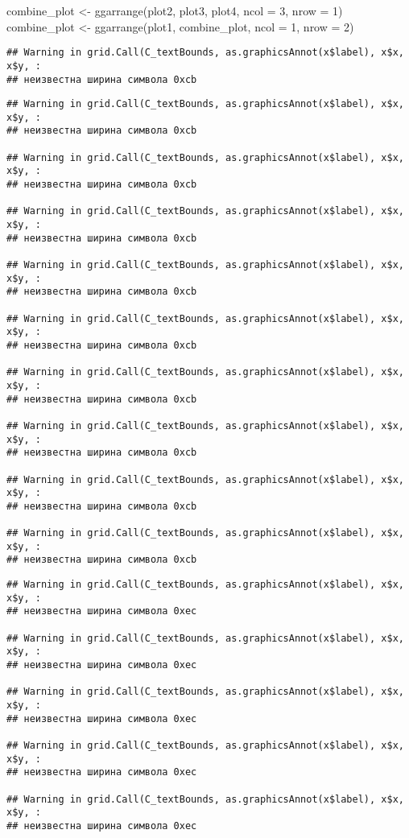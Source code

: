 \documentclass[
]{article}
\newenvironment{Shaded}{\begin{snugshade}}{\end{snugshade}}
\newcommand{\AttributeTok}[1]{\textcolor[rgb]{0.77,0.63,0.00}{#1}}
\newcommand{\DecValTok}[1]{\textcolor[rgb]{0.00,0.00,0.81}{#1}}
\newcommand{\FunctionTok}[1]{\textcolor[rgb]{0.00,0.00,0.00}{#1}}
\newcommand{\NormalTok}[1]{#1}
\newcommand{\OtherTok}[1]{\textcolor[rgb]{0.56,0.35,0.01}{#1}}
\begin{document}
\begin{Shaded}
\begin{Highlighting}[]
\NormalTok{combine\_plot }\OtherTok{\textless{}{-}} \FunctionTok{ggarrange}\NormalTok{(plot2, plot3, plot4, }\AttributeTok{ncol =} \DecValTok{3}\NormalTok{, }\AttributeTok{nrow =} \DecValTok{1}\NormalTok{)}
\NormalTok{combine\_plot }\OtherTok{\textless{}{-}} \FunctionTok{ggarrange}\NormalTok{(plot1, combine\_plot, }\AttributeTok{ncol =} \DecValTok{1}\NormalTok{, }\AttributeTok{nrow =} \DecValTok{2}\NormalTok{)}
\end{Highlighting}
\end{Shaded}

\begin{verbatim}
## Warning in grid.Call(C_textBounds, as.graphicsAnnot(x$label), x$x, x$y, :
## неизвестна ширина символа 0xcb
\end{verbatim}

\begin{verbatim}
## Warning in grid.Call(C_textBounds, as.graphicsAnnot(x$label), x$x, x$y, :
## неизвестна ширина символа 0xcb

## Warning in grid.Call(C_textBounds, as.graphicsAnnot(x$label), x$x, x$y, :
## неизвестна ширина символа 0xcb

## Warning in grid.Call(C_textBounds, as.graphicsAnnot(x$label), x$x, x$y, :
## неизвестна ширина символа 0xcb

## Warning in grid.Call(C_textBounds, as.graphicsAnnot(x$label), x$x, x$y, :
## неизвестна ширина символа 0xcb

## Warning in grid.Call(C_textBounds, as.graphicsAnnot(x$label), x$x, x$y, :
## неизвестна ширина символа 0xcb

## Warning in grid.Call(C_textBounds, as.graphicsAnnot(x$label), x$x, x$y, :
## неизвестна ширина символа 0xcb

## Warning in grid.Call(C_textBounds, as.graphicsAnnot(x$label), x$x, x$y, :
## неизвестна ширина символа 0xcb

## Warning in grid.Call(C_textBounds, as.graphicsAnnot(x$label), x$x, x$y, :
## неизвестна ширина символа 0xcb

## Warning in grid.Call(C_textBounds, as.graphicsAnnot(x$label), x$x, x$y, :
## неизвестна ширина символа 0xcb
\end{verbatim}

\begin{verbatim}
## Warning in grid.Call(C_textBounds, as.graphicsAnnot(x$label), x$x, x$y, :
## неизвестна ширина символа 0xec

## Warning in grid.Call(C_textBounds, as.graphicsAnnot(x$label), x$x, x$y, :
## неизвестна ширина символа 0xec

## Warning in grid.Call(C_textBounds, as.graphicsAnnot(x$label), x$x, x$y, :
## неизвестна ширина символа 0xec

## Warning in grid.Call(C_textBounds, as.graphicsAnnot(x$label), x$x, x$y, :
## неизвестна ширина символа 0xec

## Warning in grid.Call(C_textBounds, as.graphicsAnnot(x$label), x$x, x$y, :
## неизвестна ширина символа 0xec
\end{verbatim}
\end{document}
